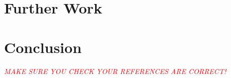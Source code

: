 \documentclass{UoYCSproject}
\begin{document}
	\chapter{Further Work}
    \label{chap:further}
	
	\chapter{Conclusion}
    \label{chap:conclusion}
    
    \textcolor{red}{\emph{MAKE SURE YOU CHECK YOUR REFERENCES ARE CORRECT!}}
        
    
	
\end{document}
